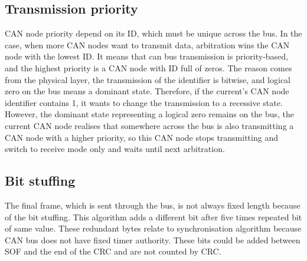 \documentclass{ctuthesis}
\begin{document}
  \subsection{Transmission priority}
   CAN node priority depend on its ID, which must be unique across the bus. In the case, when more CAN nodes want to transmit data, arbitration wins the CAN node with the lowest ID. It means that can bus transmission is priority-based, and the highest priority is a CAN node with ID full of zeros. The reason comes from the physical layer, the transmission of the identifier is bitwise, and logical zero on the bus means a dominant state. Therefore, if the current's CAN node identifier contains 1, it wants to change the transmission to a recessive state. However, the dominant state representing a logical zero remains on the bus, the current CAN node realises that somewhere across the bus is also transmitting a CAN node with a higher priority, so this CAN node stops transmitting and switch to receive mode only and waits until next arbitration.
  \subsection{Bit stuffing}
   The final frame, which is sent through the bus, is not always fixed length because of the bit stuffing. This algorithm adds a different bit after five times repeated bit of same value. These redundant bytes relate to synchronisation algorithm because CAN bus does not have fixed timer authority. These bits could be added between SOF and the end of the  CRC and are not counted by CRC\cite{can_crc}.
\end{document}
